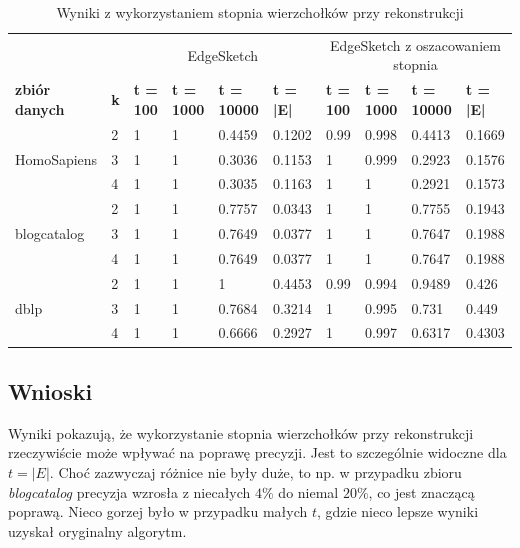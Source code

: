    \begin{table}[!ht]
        \small
        \centering
        \begin{tabular}{|l|l|l|l|l|l|l|l|l|l|}
        \hline
        & & \multicolumn{4}{c|}{EdgeSketch} & \multicolumn{4}{c|}{EdgeSketch z oszacowaniem stopnia} \\ \cline{1-10}
            \textbf{zbiór danych} & \textbf{k} & \textbf{t = 100} & \textbf{t = 1000} & \textbf{t = 10000} & \textbf{t = |E|} & \textbf{t = 100} & \textbf{t = 1000} & \textbf{t = 10000} & \textbf{t = |E|} \\ \hline\hline
            \multirow{3}{*}{HomoSapiens} & 2 & 1 & 1 & 0.4459 & 0.1202 & 0.99 & 0.998 & 0.4413 & 0.1669 \\ \cline{2-10}
            & 3 & 1 & 1 & 0.3036 & 0.1153 & 1 & 0.999 & 0.2923 & 0.1576 \\ \cline{2-10}
            & 4 & 1 & 1 & 0.3035 & 0.1163 & 1 & 1 & 0.2921 & 0.1573 \\ \hline\hline
            \multirow{3}{*}{blogcatalog} & 2 & 1 & 1 & 0.7757 & 0.0343 & 1 & 1 & 0.7755 & 0.1943 \\ \cline{2-10}
            & 3 & 1 & 1 & 0.7649 & 0.0377 & 1 & 1 & 0.7647 & 0.1988 \\ \cline{2-10}
            & 4 & 1 & 1 & 0.7649 & 0.0377 & 1 & 1 & 0.7647 & 0.1988 \\ \hline\hline
            \multirow{3}{*}{dblp} & 2 & 1 & 1 & 1 & 0.4453 & 0.99 & 0.994 & 0.9489 & 0.426 \\ \cline{2-10}
            & 3 & 1 & 1 & 0.7684 & 0.3214 & 1 & 0.995 & 0.731 & 0.449 \\ \cline{2-10}
            & 4 & 1 & 1 & 0.6666 & 0.2927 & 1 & 0.997 & 0.6317 & 0.4303 \\ \hline
        \end{tabular}
        \caption{Wyniki z wykorzystaniem stopnia wierzchołków przy rekonstrukcji}
        \label{tab:degree}
    \end{table}

    \subsection{Wnioski}
    Wyniki pokazują, że wykorzystanie stopnia wierzchołków przy rekonstrukcji rzeczywiście może wpływać na poprawę precyzji. Jest to szczególnie widoczne dla $t = |E|$. Choć zazwyczaj różnice nie były duże, to np. w przypadku zbioru \textit{blogcatalog} precyzja wzrosła z niecałych $4\%$ do niemal $20\%$, co jest znaczącą poprawą. Nieco gorzej było w przypadku małych $t$, gdzie nieco lepsze wyniki uzyskał oryginalny algorytm.

